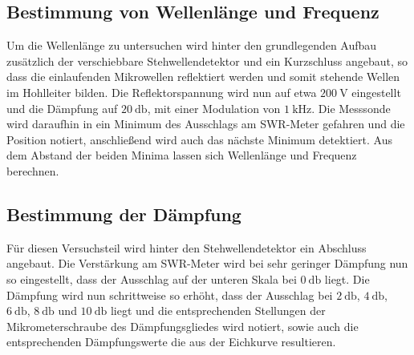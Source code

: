 \subsection{Bestimmung von Wellenlänge und Frequenz}
Um die Wellenlänge zu untersuchen wird hinter den grundlegenden Aufbau zusätzlich der
verschiebbare Stehwellendetektor und ein Kurzschluss angebaut, so dass die einlaufenden
Mikrowellen reflektiert werden und somit stehende Wellen im Hohlleiter bilden. Die Reflektorspannung
wird nun auf etwa $\SI{200}{\volt}$ eingestellt und die Dämpfung auf $\SI{20}{\decibel}$, mit einer
Modulation von $\SI{1}{\kilo\hertz}$. Die Messsonde wird daraufhin in ein Minimum des Ausschlags am SWR-Meter
gefahren und die Position notiert, anschließend wird auch das nächste Minimum detektiert. Aus dem
Abstand der beiden Minima lassen sich Wellenlänge und Frequenz berechnen.

\subsection{Bestimmung der Dämpfung}
Für diesen Versuchsteil wird hinter den Stehwellendetektor ein Abschluss angebaut. Die Verstärkung am
SWR-Meter wird bei sehr geringer Dämpfung nun so eingestellt, dass der Ausschlag auf der
unteren Skala bei $\SI{0}{\decibel}$ liegt. Die Dämpfung wird nun schrittweise so erhöht, dass
der Ausschlag bei $\SI{2}{\decibel}$, $\SI{4}{\decibel}$, $\SI{6}{\decibel}$, $\SI{8}{\decibel}$
und $\SI{10}{\decibel}$ liegt und die entsprechenden Stellungen der Mikrometerschraube des Dämpfungsgliedes
wird notiert, sowie auch die entsprechenden Dämpfungswerte die aus der Eichkurve resultieren.

